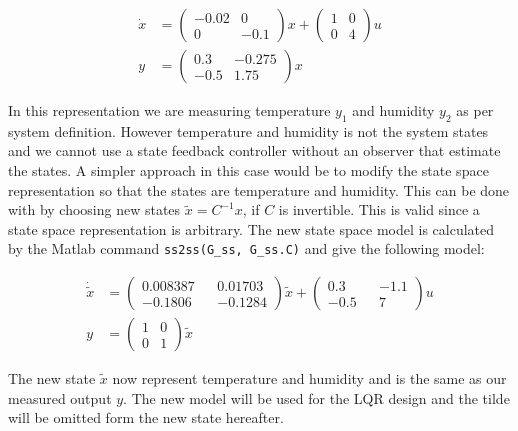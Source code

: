 \documentclass[a4paper, titlepage]{article}
\begin{document}
\begin{equation}
\begin{split}
\dot{x} &= 
\begin{pmatrix}
-0.02 & 0 \\ 0 & -0.1
\end{pmatrix}x
+
\begin{pmatrix}
1 & 0 \\ 0 & 4
\end{pmatrix}u \\
y &= 
\begin{pmatrix}
0.3 & -0.275 \\ -0.5 & 1.75
\end{pmatrix}x
\end{split}
\label{equ:oldSS}
\end{equation}

In this representation we are measuring temperature $y_1$ and humidity $y_2$ as per system definition.
However temperature and humidity is not the system states and we cannot use a state feedback controller without an observer that estimate the states.
A simpler approach in this case would be to modify the state space representation so that the states are temperature and humidity.
This can be done with by choosing new states $\tilde{x} = C^{-1}x$, if $C$ is invertible.
This is valid since a state space representation is arbitrary.
The new state space model is calculated by the Matlab command \verb|ss2ss(G_ss, G_ss.C)| and give the following model:

\begin{equation}
\begin{split}
\dot{\tilde{x}} &= 
\begin{pmatrix}
0.008387 && 0.01703 \\ -0.1806 && -0.1284
\end{pmatrix}\tilde{x}
+
\begin{pmatrix}
0.3 && -1.1 \\ -0.5 && 7
\end{pmatrix}u \\
y &= 
\begin{pmatrix}
1 & 0 \\ 0 & 1
\end{pmatrix}\tilde{x}
\end{split}
\label{equ:newSS}
\end{equation}

The new state $\tilde{x}$ now represent temperature and humidity and is the same as our measured output $y$.
The new model will be used for the LQR design and the tilde will be omitted form the new state hereafter.
\end{document}
